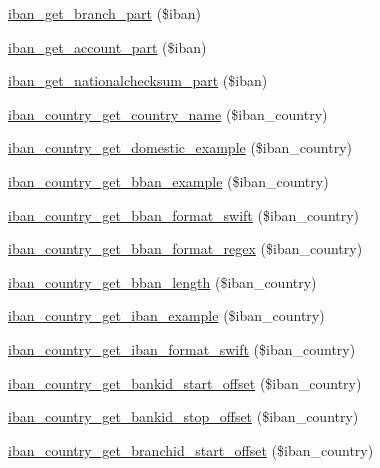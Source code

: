 \begin{DoxyCompactItemize}
\item 
\hyperlink{classWEPPO_1_1Helpers_1_1IBAN_af8023e39cb7b09ff7775df996577fcb5}{iban\+\_\+get\+\_\+branch\+\_\+part} (\$iban)
\item 
\hyperlink{classWEPPO_1_1Helpers_1_1IBAN_a76327e4a90d855ae2c3b12198a73a9e8}{iban\+\_\+get\+\_\+account\+\_\+part} (\$iban)
\item 
\hyperlink{classWEPPO_1_1Helpers_1_1IBAN_ad2c05b5d302a99bfb5f541b3aff11513}{iban\+\_\+get\+\_\+nationalchecksum\+\_\+part} (\$iban)
\item 
\hyperlink{classWEPPO_1_1Helpers_1_1IBAN_ab259d8153928b705affd39a4e2915030}{iban\+\_\+country\+\_\+get\+\_\+country\+\_\+name} (\$iban\+\_\+country)
\item 
\hyperlink{classWEPPO_1_1Helpers_1_1IBAN_a08b7044e6f2c5caced2f2bb36da79d8b}{iban\+\_\+country\+\_\+get\+\_\+domestic\+\_\+example} (\$iban\+\_\+country)
\item 
\hyperlink{classWEPPO_1_1Helpers_1_1IBAN_a563167462d8db013245a4e24fea97460}{iban\+\_\+country\+\_\+get\+\_\+bban\+\_\+example} (\$iban\+\_\+country)
\item 
\hyperlink{classWEPPO_1_1Helpers_1_1IBAN_aaa4119c9d22bfabb434bf59fb4872a79}{iban\+\_\+country\+\_\+get\+\_\+bban\+\_\+format\+\_\+swift} (\$iban\+\_\+country)
\item 
\hyperlink{classWEPPO_1_1Helpers_1_1IBAN_aa8ca7552edcb78a8ae8b1d383cf90c7a}{iban\+\_\+country\+\_\+get\+\_\+bban\+\_\+format\+\_\+regex} (\$iban\+\_\+country)
\item 
\hyperlink{classWEPPO_1_1Helpers_1_1IBAN_a8eebd74274fe3c12b4f3b069cd3aeb07}{iban\+\_\+country\+\_\+get\+\_\+bban\+\_\+length} (\$iban\+\_\+country)
\item 
\hyperlink{classWEPPO_1_1Helpers_1_1IBAN_add0eb0e0ce9d95d00c4efbea146d37b9}{iban\+\_\+country\+\_\+get\+\_\+iban\+\_\+example} (\$iban\+\_\+country)
\item 
\hyperlink{classWEPPO_1_1Helpers_1_1IBAN_a5509a52e75ebca47c4e24ff669a87ef0}{iban\+\_\+country\+\_\+get\+\_\+iban\+\_\+format\+\_\+swift} (\$iban\+\_\+country)
\item 
\hyperlink{classWEPPO_1_1Helpers_1_1IBAN_a30c2380b61a50245057077d5d715aa3d}{iban\+\_\+country\+\_\+get\+\_\+bankid\+\_\+start\+\_\+offset} (\$iban\+\_\+country)
\item 
\hyperlink{classWEPPO_1_1Helpers_1_1IBAN_a95e16a0868b3a993cc041e0b3af3abec}{iban\+\_\+country\+\_\+get\+\_\+bankid\+\_\+stop\+\_\+offset} (\$iban\+\_\+country)
\item 
\hyperlink{classWEPPO_1_1Helpers_1_1IBAN_ad44e6f373a731dcc42cac90a40d962ba}{iban\+\_\+country\+\_\+get\+\_\+branchid\+\_\+start\+\_\+offset} (\$iban\+\_\+country)

\end{DoxyCompactItemize}
